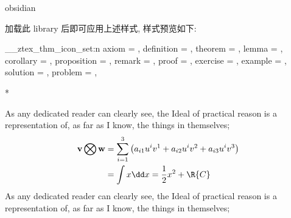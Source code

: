 \begin{function}[updated=2024-12-05]{obsidian}
  \begin{syntax}
  \end{syntax}
  加载此 library 后即可应用上述样式, 样式预览如下: 
\end{function}
\begingroup
\ExplSyntaxOn\makeatletter
{}
\__ztex_thm_icon_set:n 
  {
    axiom       = ,
    definition  = , 
    theorem     = , 
    lemma       = ,
    corollary   = , 
    proposition = , 
    remark      = ,
    proof       = , 
    exercise    = ,
    example     = ,
    solution    = , 
    problem     = ,
  }
\makeatother\ExplSyntaxOff
{}
\begin{DocExample}*
\begin{proposition}
As any dedicated reader can clearly see, the Ideal of practical
reason is a representation of, as far as I know, the things in themselves; 
\begin{align}
\underset{}{\mathbf{v} \bigotimes \mathbf{w}} 
    & = \sum_{i=1}^3\left(a_{i1}u^iv^1+a_{i2}u^iv^2+a_{i3}u^iv^3\right) \\
    & = \int x \dd x = \frac12 x^2 + \R{C} 
  \end{align}  
As any dedicated reader can clearly see, the Ideal of practical
reason is a representation of, as far as I know, the things in themselves;%
\end{proposition}
\end{DocExample}
\endgroup
